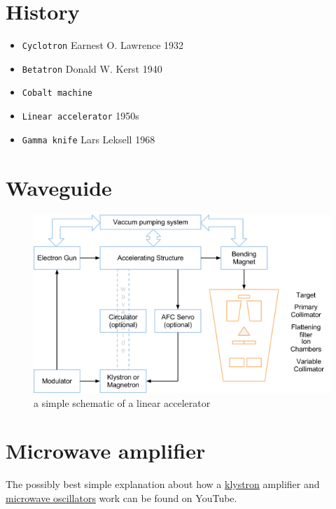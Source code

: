 \documentclass[]{book}
\providecommand{\tightlist}{%
  \setlength{\itemsep}{0pt}\setlength{\parskip}{0pt}}
\theoremstyle{definition}
\theoremstyle{definition}
\theoremstyle{definition}
\theoremstyle{remark}
\begin{document}
\section{History}\label{history-1}

\begin{itemize}
\tightlist
\item
  \texttt{Cyclotron} Earnest O. Lawrence 1932
\item
  \texttt{Betatron} Donald W. Kerst 1940
\item
  \texttt{Cobalt\ machine}
\item
  \texttt{Linear\ accelerator} 1950s
\item
  \texttt{Gamma\ knife} Lars Leksell 1968
\end{itemize}

\section{Waveguide}\label{waveguide}

\begin{figure}

{\centering \includegraphics{figures/components} 

}

\caption{a simple schematic of a linear accelerator}\label{fig:unnamed-chunk-3}
\end{figure}

\section{Microwave amplifier}\label{microwave-amplifier}

The possibly best simple explanation about how a
\href{https://www.youtube.com/watch?v=Fvud81pYGOg}{klystron} amplifier
and \href{https://www.youtube.com/watch?v=VkpEQZEGSkE\&t=108s}{microwave
oscillators} work can be found on YouTube.
\end{document}
